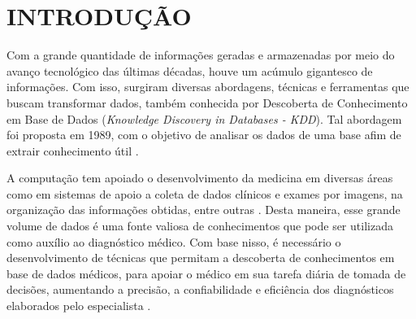 \documentclass[
	12pt,				%
	openright,			%
	oneside,	
	a4paper,				%
	english,				%
	brazil				%
]{abntex2/abntex2} %
\begin{document}
\listoffigures*
\cleardoublepage

\listoftables*
\cleardoublepage

\tableofcontents*
\cleardoublepage

\textual

\chapter{INTRODUÇÃO}

	Com a grande quantidade de informações geradas e armazenadas por meio do avanço tecnológico das últimas décadas, houve um acúmulo gigantesco de informações. Com isso, surgiram diversas abordagens, técnicas e ferramentas que buscam transformar dados, também conhecida por Descoberta de Conhecimento em Base de Dados (\textit{Knowledge Discovery in Databases - KDD}). Tal abordagem foi proposta em 1989, com o objetivo de analisar os dados de uma base afim de extrair conhecimento útil \cite{fayyad:1996}.	
	
	A computação tem apoiado o desenvolvimento da medicina em diversas áreas como em sistemas de apoio a coleta de dados clínicos e exames por imagens, na organização das informações obtidas, entre outras \cite{costa:2012}. Desta maneira, esse grande volume de dados é uma fonte valiosa de conhecimentos que pode ser utilizada como auxílio ao diagnóstico médico. Com base nisso, é necessário o desenvolvimento de técnicas que permitam a descoberta de conhecimentos em base de dados médicos, para apoiar o médico em sua tarefa diária de tomada de decisões, aumentando a precisão, a confiabilidade e eficiência dos diagnósticos elaborados pelo especialista \cite{costa:2012}.
	
\end{document}
